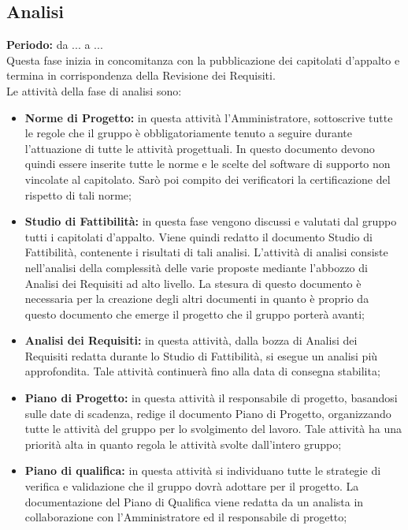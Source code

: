 	\subsection{Analisi}
	\textbf{Periodo:} da ... a ... \\
	Questa fase inizia in concomitanza con la pubblicazione dei capitolati d'appalto e termina in 			corrispondenza della Revisione dei Requisiti. \\
	Le attività della fase di analisi sono: \\
	\begin{itemize}
		\item \textbf{Norme di Progetto:} in questa attività l'Amministratore, sottoscrive tutte le regole che il gruppo è obbligatoriamente tenuto a seguire durante l'attuazione di tutte le attività progettuali. In questo documento devono quindi essere inserite tutte le norme e le scelte del software di supporto non vincolate al capitolato. Sarò poi compito dei verificatori la certificazione del rispetto di tali norme; \\
		\item \textbf{Studio di Fattibilità:} in questa fase vengono discussi e valutati dal gruppo tutti i capitolati d'appalto. Viene quindi redatto il documento Studio di Fattibilità, contenente i risultati di tali analisi. L'attività di analisi consiste nell'analisi della complessità delle varie proposte mediante l'abbozzo di Analisi dei Requisiti ad alto livello. La stesura di questo documento è necessaria per la creazione degli altri documenti in quanto è proprio da questo documento che emerge il progetto che il gruppo porterà avanti; \\
		\item \textbf{Analisi dei Requisiti:} in questa attività, dalla bozza di Analisi dei Requisiti redatta durante lo Studio di Fattibilità, si esegue un analisi più approfondita. Tale attività continuerà fino alla data di consegna stabilita; \\
		\item \textbf{Piano di Progetto:} in questa attività il responsabile di progetto, basandosi sulle date di scadenza, redige il documento Piano di Progetto, organizzando tutte le attività del gruppo per lo svolgimento del lavoro. Tale attività ha una priorità alta in quanto regola le attività svolte dall'intero gruppo; \\
		\item \textbf{Piano di qualifica:} in questa attività si individuano tutte le strategie di verifica e validazione che il gruppo dovrà adottare per il progetto. La documentazione del Piano di Qualifica viene redatta da un analista in collaborazione con l'Amministratore ed il responsabile di progetto; \\

\end{itemize}
